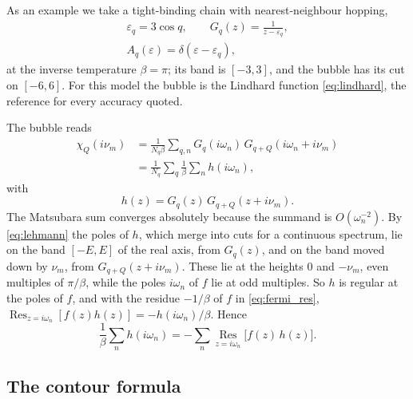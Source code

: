 \documentclass[aps,prb,reprint,a4paper]{revtex4-2}
\newcommand{\Res}{\operatorname*{Res}}
\begin{document}
As an example we take a tight-binding chain with nearest-neighbour hopping,
\begin{equation}
  \begin{gathered}
  \varepsilon_q=3\cos q,\qquad G_q(z)=\frac1{z-\varepsilon_q},\\
  A_q(\varepsilon)=\delta(\varepsilon-\varepsilon_q),
  \end{gathered}
  \label{eq:model}
\end{equation}
at the inverse temperature $\beta=\pi$; its band is $[-3,3]$, and the bubble has its cut on $[-6,6]$. For this model the bubble is the Lindhard function \eqref{eq:lindhard}, the reference for every accuracy quoted.

The bubble reads
\begin{equation}
  \begin{aligned}
  \chi_Q(i\nu_m)&=\frac1{N_q\beta}\sum_{q,n}G_q(i\omega_n)\,G_{q+Q}(i\omega_n+i\nu_m)\\
  &=\frac1{N_q}\sum_q\frac1\beta\sum_nh(i\omega_n),
  \end{aligned}
  \label{eq:bubble_def}
\end{equation}
with
\begin{equation}
  h(z)=G_q(z)\,G_{q+Q}(z+i\nu_m).
  \label{eq:h}
\end{equation}
The Matsubara sum converges absolutely because the summand is $O(\omega_n^{-2})$. By \eqref{eq:lehmann} the poles of $h$, which merge into cuts for a continuous spectrum, lie on the band $[-E,E]$ of the real axis, from $G_q(z)$, and on the band moved down by $\nu_m$, from $G_{q+Q}(z+i\nu_m)$. These lie at the heights $0$ and $-\nu_m$, even multiples of $\pi/\beta$, while the poles $i\omega_n$ of $f$ lie at odd multiples. So $h$ is regular at the poles of $f$, and with the residue $-1/\beta$ of $f$ in \eqref{eq:fermi_res}, $\Res_{z=i\omega_n}[f(z)h(z)]=-h(i\omega_n)/\beta$. Hence
\begin{equation}
  \frac1\beta\sum_nh(i\omega_n)=-\sum_n\Res_{z=i\omega_n}\big[f(z)\,h(z)\big].
  \label{eq:matsum_residues}
\end{equation}
\subsection{The contour formula}
\label{sec:contour}
\end{document}
